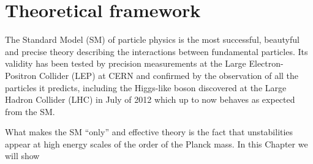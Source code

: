 \clearpage{\pagestyle{empty}\cleardoublepage}

\chapter{Theoretical framework}\label{chap:TH}

\vspace{-2.5cm}



\vspace{0.5cm}

The Standard Model (SM) of particle physics is the most 
successful, beautyful and precise theory describing the interactions
between fundamental particles. Its validity has been tested by 
precision measurements at the Large Electron-Positron Collider (LEP)
at CERN and confirmed by the observation of all the particles it 
predicts, including the Higgs-like boson discovered at the
Large Hadron Collider (LHC) in July of 2012 which up to now 
behaves as expected from the SM.

What makes the SM ``only'' and effective theory is the fact 
that unstabilities appear at high energy scales of the order of the
Planck mass. In this Chapter we will show 






